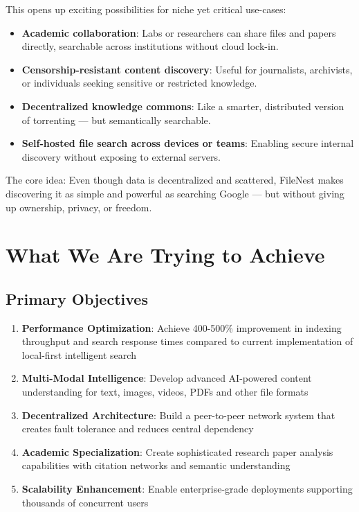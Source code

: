 \documentclass[11pt,a4paper]{article}
\begin{document}
This opens up exciting possibilities for niche yet critical use-cases:

\begin{itemize}
    \item \textbf{Academic collaboration}: Labs or researchers can share files and papers directly, searchable across institutions without cloud lock-in.

    \item \textbf{Censorship-resistant content discovery}: Useful for journalists, archivists, or individuals seeking sensitive or restricted knowledge.

    \item \textbf{Decentralized knowledge commons}: Like a smarter, distributed version of torrenting — but semantically searchable.

    \item \textbf{Self-hosted file search across devices or teams}: Enabling secure internal discovery without exposing to external servers.

\end{itemize}

The core idea: Even though data is decentralized and scattered, FileNest makes discovering it as simple and powerful as searching Google — but without giving up ownership, privacy, or freedom.

\section{What We Are Trying to Achieve}

\subsection{Primary Objectives}
\begin{enumerate}
    \item \textbf{Performance Optimization}: Achieve 400-500\% improvement in indexing throughput and search response times compared to current implementation of local-first intelligent search
    \item \textbf{Multi-Modal Intelligence}: Develop advanced AI-powered content understanding for text, images, videos, PDFs and other file formats
    \item \textbf{Decentralized Architecture}: Build a peer-to-peer network system that creates fault tolerance and reduces central dependency
    \item \textbf{Academic Specialization}: Create sophisticated research paper analysis capabilities with citation networks and semantic understanding
    \item \textbf{Scalability Enhancement}: Enable enterprise-grade deployments supporting thousands of concurrent users
\end{enumerate}
\end{document}
